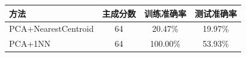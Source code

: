 \begin{tabular}{lccc}
\toprule
方法 & 主成分数 & 训练准确率 & 测试准确率 \\
\midrule
PCA+NearestCentroid & 64 & 20.47\% & 19.97\% \\
PCA+1NN & 64 & 100.00\% & 53.93\% \\
\bottomrule
\end{tabular}
